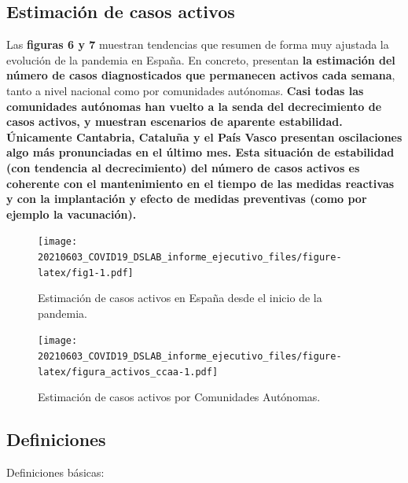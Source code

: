 \documentclass[
  11pt,
]{article}
\begin{document}
\clearpage

\setcounter{page}{9}

\hypertarget{estimaciuxf3n-de-casos-activos}{%
\subsection{Estimación de casos
activos}\label{estimaciuxf3n-de-casos-activos}}

Las \textbf{figuras 6 y 7} muestran tendencias que resumen de forma muy
ajustada la evolución de la pandemia en España. En concreto, presentan
\textbf{la estimación del número de casos diagnosticados que permanecen
activos cada semana}, tanto a nivel nacional como por comunidades
autónomas. \textbf{Casi todas las comunidades autónomas han vuelto a la
senda del decrecimiento de casos activos, y muestran escenarios de
aparente estabilidad. Únicamente Cantabria, Cataluña y el País Vasco
presentan oscilaciones algo más pronunciadas en el último mes. Esta
situación de estabilidad (con tendencia al decrecimiento) del número de
casos activos es coherente con el mantenimiento en el tiempo de las
medidas reactivas y con la implantación y efecto de medidas preventivas
(como por ejemplo la vacunación).}

\vspace{0.2cm}

\begin{figure}
\centering
\texttt{[image: 20210603\_COVID19\_DSLAB\_informe\_ejecutivo\_files/figure-latex/fig1-1.pdf]}
\caption{\label{fig:fig17a_res} Estimación de casos activos en España
desde el inicio de la pandemia.}
\end{figure}

\begin{figure}
\centering
\texttt{[image: 20210603\_COVID19\_DSLAB\_informe\_ejecutivo\_files/figure-latex/figura\_activos\_ccaa-1.pdf]}
\caption{\label{fig:figura_activos_ccaa} Estimación de casos activos por
Comunidades Autónomas.}
\end{figure}

\newpage
\setcounter{page}{11}

\hypertarget{definiciones}{%
\subsection{Definiciones}\label{definiciones}}

Definiciones básicas:
\end{document}
